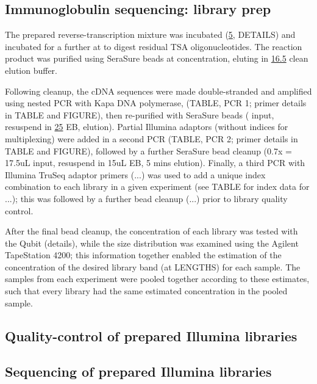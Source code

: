 \subsection{Immunoglobulin sequencing: library prep} 
The prepared reverse-transcription mixture was incubated  (\ul{5}, DETAILS) and incubated for a further  at  to digest residual TSA oligonucleotides. The reaction product was purified using SeraSure beads at  concentration, eluting in \ul{16.5} clean elution buffer. %

Following cleanup, the cDNA sequences were made double-stranded and amplified using nested PCR with Kapa DNA polymerase, %
(TABLE, PCR 1; primer details in TABLE and FIGURE), then re-purified with SeraSure beads ( input, resuspend in \ul{25} EB,  elution). Partial Illumina adaptors (without indices for multiplexing) were added in a second PCR (TABLE, PCR 2; primer details in TABLE and FIGURE), followed by a further SeraSure bead cleanup (0.7x = 17.5uL input, resuspend in 15uL EB, 5 mins elution). Finally, a third PCR with Illumina TruSeq adaptor primers (...) was used to add a unique index combination to each library in a given experiment (see TABLE for index data for ...); this was followed by a further bead cleanup (...) prior to library quality control.

After the final bead cleanup, the concentration of each library was tested with the Qubit (details), while the size distribution was examined using the Agilent TapeStation 4200; this information together enabled the estimation of the concentration of the desired library band (at LENGTHS) for each sample. The samples from each experiment were pooled together according to these estimates, such that every library had the same estimated concentration in the pooled sample. 


\subsection{Quality-control of prepared Illumina libraries}

\subsection{Sequencing of prepared Illumina libraries}
